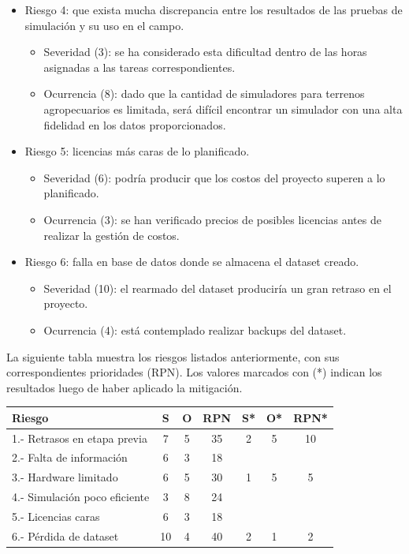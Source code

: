 \documentclass[
11pt, %
codirector, %
]{charter}
\begin{document}
\begin{itemize}
	\item Riesgo 4: que exista mucha discrepancia entre los resultados de las pruebas de simulación y su uso en el campo.
	\begin{itemize}
		\item Severidad (3): se ha considerado esta dificultad dentro de las horas asignadas a las tareas correspondientes. 
		\item Ocurrencia (8): dado que la cantidad de simuladores para terrenos agropecuarios es limitada, será difícil encontrar un simulador con una alta fidelidad en los datos proporcionados.
	\end{itemize}
	
	\item Riesgo 5: licencias más caras de lo planificado.
	\begin{itemize}
		\item Severidad (6): podría producir que los costos del proyecto superen a lo planificado.
		\item Ocurrencia (3): se han verificado precios de posibles licencias antes de realizar la gestión de costos.
	\end{itemize}
	
	\item Riesgo 6: falla en base de datos donde se almacena el dataset creado.
	\begin{itemize}
		\item Severidad (10): el rearmado del dataset produciría un gran retraso en el proyecto.
		\item Ocurrencia (4): está contemplado realizar backups del dataset.
	\end{itemize}

\end{itemize}
	
La siguiente tabla muestra los riesgos listados anteriormente, con sus correspondientes prioridades (RPN). Los valores marcados con (*) indican los resultados luego de haber aplicado la mitigación.

\begin{table}[htpb]
\centering
\begin{tabularx}{\linewidth}{@{}|X|c|c|c|c|c|c|@{}}
\hline
\rowcolor[HTML]{C0C0C0} 
Riesgo 						  & S  & O & RPN & S* & O* & RPN*	\\ \hline
1.- Retrasos en etapa previa  & 7  & 5 & 35  & 2 & 5 & 10		\\ \hline
2.- Falta de información 	  & 6  & 3 & 18  &   &   &		\\ \hline
3.- Hardware limitado 		  & 6  & 5 & 30  & 1 & 5 & 5 	\\ \hline
4.- Simulación poco eficiente & 3  & 8 & 24  &   &   &  	\\ \hline
5.- Licencias caras			  & 6  & 3 & 18  &   &   &  	\\ \hline
6.- Pérdida de dataset		  & 10 & 4 & 40  & 2 & 1 & 2  	\\ \hline
\end{tabularx}%
\end{table}
\end{document}
